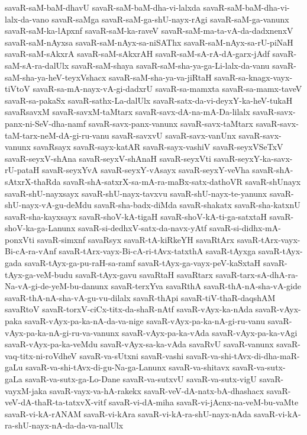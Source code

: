 {savaR-saM-baM-dhavU
savaR-saM-baM-dha-vi-lalxda
savaR-saM-baM-dha-vi-lalx-da-vano
savaR-saMga
savaR-saM-ga-shU-nayx-rAgi
savaR-saM-ga-vanunx
savaR-saM-ka-lApxnf
savaR-saM-ka-raveV
savaR-saM-ma-ta-vA-da-dadxnenxV
savaR-saM-nAyxsa
savaR-saM-nAyx-sa-niSAThx
savaR-saM-nAyx-sa-rU-piNaH
savaR-saM-sAkxrA
savaR-saM-sAkxrAH
savaR-saM-sA-rA-dA-garx-jAdf
savaR-saM-sA-ra-dalUlx
savaR-saM-shaya
savaR-saM-sha-ya-ga-Li-lalx-da-vanu
savaR-saM-sha-ya-heV-teyxVshacx
savaR-saM-sha-ya-va-jiRtaH
savaR-sa-knagx-vayx-tiVtoV
savaR-sa-mA-nayx-vA-gi-dadxrU
savaR-sa-mamxta
savaR-sa-mamx-taveV
savaR-sa-pakaSx
savaR-sathx-La-dalUlx
savaR-satx-da-vi-deyxY-ka-heV-tukaH
savaRsavxM
savaR-savxM-taMtarx
savaR-savx-dA-na-mA-Da-lilalx
savaR-savx-panx-ni-SeV-dha-namf
savaR-savx-panx-vanunx
savaR-savx-taMtarx
savaR-savx-taM-tarx-neM-dA-gi-ru-vanu
savaR-savxvU
savaR-savx-vanUnx
savaR-savx-vanunx
savaRsayx
savaR-sayx-katAR
savaR-sayx-vashiV
savaR-seyxVSeTxV
savaR-seyxV-shAna
savaR-seyxV-shAnaH
savaR-seyxVti
savaR-seyxY-ka-savx-rU-pataH
savaR-seyxYvA
savaR-seyxY-vAsayx
savaR-seyxY-veVha
savaR-shA-sAtxrX-thaRda
savaR-shA-satxrX-sa-mA-ra-maBx-satx-dathoVR
savaR-shUnayx
savaR-shU-nayxsayx
savaR-shU-nayx-tavxvu
savaR-shU-nayx-te-yanunx
savaR-shU-nayx-vA-gu-deMdu
savaR-sha-badx-diMda
savaR-shakatx
savaR-sha-katxnU
savaR-sha-kayxsayx
savaR-shoV-kA-tigaH
savaR-shoV-kA-ti-ga-satxtaH
savaR-shoV-ka-ga-Lanunx
savaR-si-dedhxV-satx-da-navx-yAtf
savaR-si-didhx-mA-ponxVti
savaR-simxnf
savaRsyx
savaR-tA-kiRkeYH
savaRtArx
savaR-tArx-vayx-Bi-cA-ra-vAnf
savaR-tArx-vayx-Bi-cA-ri-tAvx-tatxthA
savaR-tAyxga
savaR-tAyx-gada
savaR-tAyx-ga-pu-raH-sa-ramf
savaR-tAyx-ga-vayx-peV-kaSxtaH
savaR-tAyx-ga-veM-budu
savaR-tAyx-gavu
savaRtaH
savaRtarx
savaR-tarx-sA-dhA-ra-Na-vA-gi-de-yeM-bu-danunx
savaR-terxYva
savaRthA
savaR-thA-nA-sha-vA-gide
savaR-thA-nA-sha-vA-gu-vu-dilalx
savaR-thApi
savaR-tiV-thaR-daqshAM
savaRtoV
savaR-torxV-ciCx-titx-da-shaR-nAtf
savaR-vAyx-ka-nAda
savaR-vAyx-paka
savaR-vAyx-pa-ka-nA-da-va-nige
savaR-vAyx-pa-ka-nA-gi-ru-vanu
savaR-vAyx-pa-ka-nA-gi-ru-va-vanunx
savaR-vAyx-pa-ka-vAda
savaR-vAyx-pa-ka-vAgi
savaR-vAyx-pa-ka-veMdu
savaR-vAyx-sa-ka-vAda
savaRvU
savaR-vanunx
savaR-vaq-titx-ni-roVdheV
savaR-va-sUtxni
savaR-vashi
savaR-va-shi-tAvx-di-dha-maR-gaLu
savaR-va-shi-tAvx-di-gu-Na-ga-Lanunx
savaR-va-shitavx
savaR-va-sutx-gaLa
savaR-va-sutx-ga-Lo-Dane
savaR-va-sutxvU
savaR-va-sutx-vigU
savaR-vayxM-jaka
savaR-vayx-va-hA-rakekx
savaR-veV-dA-natx-bA-dhashacx
savaR-veV-dA-thaR-ta-tatxvX-vitf
savaR-vi-dA-miha
savaR-vi-jAcnx-na-veM-bu-vaMte
savaR-vi-kA-rANAM
savaR-vi-kAra
savaR-vi-kA-ra-shU-nayx-nAda
savaR-vi-kA-ra-shU-nayx-nA-da-da-va-nalUlx
}
